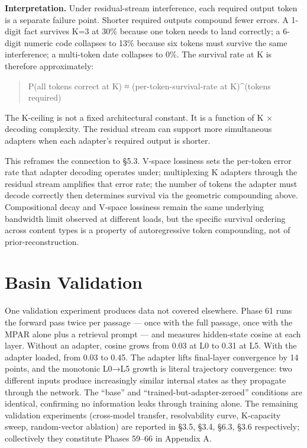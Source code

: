 \textbf{Interpretation.} Under residual-stream interference, each required output token is a separate failure point. Shorter required outputs compound fewer errors. A 1-digit fact survives K=3 at 30\% because one token needs to land correctly; a 6-digit numeric code collapses to 13\% because six tokens must survive the same interference; a multi-token date collapses to 0\%. The survival rate at K is therefore approximately:

\begin{quote}
P(all tokens correct at K) ≈ (per-token-survival-rate at K)\^{}(tokens required)
\end{quote}

The K-ceiling is not a fixed architectural constant. It is a function of K × decoding complexity. The residual stream can support more simultaneous adapters when each adapter's required output is shorter.

This reframes the connection to §5.3. V-space lossiness sets the per-token error rate that adapter decoding operates under; multiplexing K adapters through the residual stream amplifies that error rate; the number of tokens the adapter must decode correctly then determines survival via the geometric compounding above. Compositional decay and V-space lossiness remain the same underlying bandwidth limit observed at different loads, but the specific survival ordering across content types is a property of autoregressive token compounding, not of prior-reconstruction.

\section{Basin Validation}\label{basin-validation}

One validation experiment produces data not covered elsewhere. Phase 61 runs the forward pass twice per passage --- once with the full passage, once with the MPAR alone plus a retrieval prompt --- and measures hidden-state cosine at each layer. Without an adapter, cosine grows from 0.03 at L0 to 0.31 at L5. With the adapter loaded, from 0.03 to 0.45. The adapter lifts final-layer convergence by 14 points, and the monotonic L0→L5 growth is literal trajectory convergence: two different inputs produce increasingly similar internal states as they propagate through the network. The ``base'' and ``trained-but-adapter-zeroed'' conditions are identical, confirming no information leaks through training alone. The remaining validation experiments (cross-model transfer, resolvability curve, K-capacity sweep, random-vector ablation) are reported in §3.5, §3.4, §6.3, §3.6 respectively; collectively they constitute Phases 59--66 in Appendix A.

